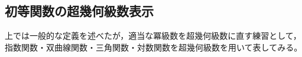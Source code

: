 \documentclass[a4paper,draft]{ltjsarticle}
\begin{document}
\begin{comment}
$z=1$における収束性はd'Alembertの収束判定法からは保証されないが，実際には後述するEuler積分表示から導かれる超幾何定理から，
\begin{equation}
    \Gauss{a}{b}{c}{1}=\dfrac{\fun{\Gamma}{c}\fun{\Gamma}{c-a-b}}{\fun{\Gamma}{c-a}\fun{\Gamma}{c-b}}\quad\pare{\re{c-a-b}>0}
\end{equation}
となることが示される。    
\end{comment}

\subsection{初等関数の超幾何級数表示}
上では一般的な定義を述べたが，適当な冪級数を超幾何級数に直す練習として，
指数関数・双曲線関数・三角関数・対数関数を超幾何級数を用いて表してみる。
\end{document}
